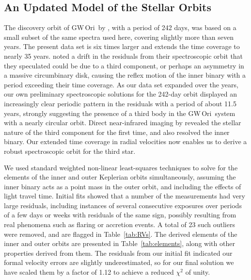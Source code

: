 \documentclass[twocolumn]{aastex6}
\newcommand{\gw}{GW\,Ori}
\begin{document}
\subsection{An Updated Model of the Stellar Orbits} \label{sec:orbit}

The discovery orbit of \gw\ by \cite{mathieu91}, with a period of
242 days, was based on a small subset of the same spectra used here,
covering slightly more than seven years. The present data set is six
times larger and extends the time coverage to nearly 35 years.
\cite{mathieu91} noted a drift in the residuals from their
spectroscopic orbit that they speculated could be due to a third
component, or perhaps an asymmetry in a massive circumbinary disk,
causing the reflex motion of the inner binary with a period exceeding
their time coverage. As our data set expanded over the years, our own
preliminary spectroscopic solutions for the 242-day orbit displayed an
increasingly clear periodic pattern in the residuals with a period of
about 11.5 years, strongly suggesting the presence of a third body in
the \gw\ system with a nearly circular orbit. Direct near-infrared
imaging by \cite{berger11} revealed the stellar nature of the third
component for the first time, and also resolved the inner binary.  Our
extended time coverage in radial velocities now enables us to derive a
robust spectroscopic orbit for the third star.

We used standard weighted non-linear least-squares techniques
\citep[e.g.,][]{press92} to solve for the elements of the inner and
outer Keplerian orbits simultaneously, assuming the inner binary acts
as a point mass in the outer orbit, and including the effects of light
travel time. Initial fits showed that a number of the measurements had
very large residuals, including instances of several consecutive
exposures over periods of a few days or weeks with residuals of the
same sign, possibly resulting from real phenomena such as flaring or
accretion events. A total of 23 such outliers were removed, and are
flagged in Table~\ref{tab:RVs}. The derived elements of the inner and
outer orbits are presented in Table~\ref{tab:elements}, along with
other properties derived from them. The residuals from our initial fit
indicated our formal velocity errors are slightly underestimated, so
for our final solution we have scaled them by a factor of 1.12 to
achieve a reduced $\chi^2$ of unity.
\end{document}
